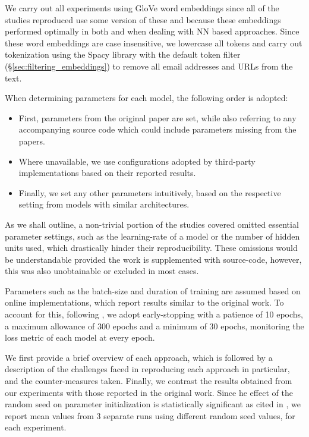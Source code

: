 \documentclass[../../fyp.tex]{subfiles}
\begin{document}
We carry out all experiments using GloVe word embeddings \cite{pennington} since all of the studies reproduced use some version of these and because these embeddings performed optimally in both \cite{moore2018} and \cite{bhuwandhingra2017} when dealing with NN based approaches. Since these word embeddings are case insensitive, we lowercase all tokens and carry out tokenization using the Spacy library with the default token filter (\S\ref{sec:filtering_embeddings}) to remove all email addresses and URLs from the text.

When determining parameters for each model, the following order is adopted: 
\begin{itemize}
	\item First, parameters from the original paper are set, while also referring to any accompanying source code which could include parameters missing from the papers.
	\item Where unavailable, we use configurations adopted by third-party implementations based on their reported results.
	\item Finally, we set any other parameters intuitively, based on the respective setting from models with similar architectures.
\end{itemize}
   
As we shall outline, a non-trivial portion of the studies covered omitted essential parameter settings, such as the learning-rate of a model or the number of hidden units used, which drastically hinder their reproducibility. These omissions would be understandable provided the work is supplemented with source-code, however, this was also unobtainable or excluded in most cases.

Parameters such as the batch-size and duration of training are assumed based on online implementations, which report results similar to the original work. To account for this, following \cite{moore2018}, we adopt early-stopping with a patience of 10 epochs, a maximum allowance of 300 epochs and a minimum of 30 epochs, monitoring the loss metric of each model at every epoch. 

We first provide a brief overview of each approach, which is followed by a description of the challenges faced in reproducing each approach in particular, and the counter-measures taken. Finally, we contrast the results obtained from our experiments with those reported in the original work. Since he effect of the random seed on parameter initialization is statistically significant \cite{reimers2017} as cited in \cite{moore2018}, we report mean values from 3 separate runs using different random seed values, for each experiment. 
\end{document}
